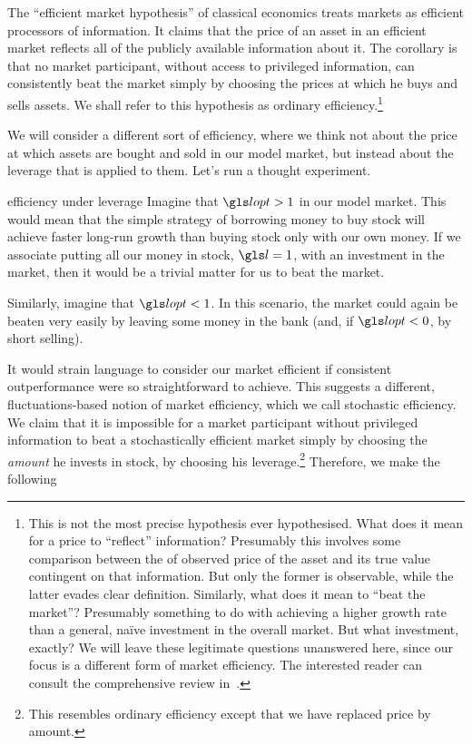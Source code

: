 The ``efficient market hypothesis'' of classical economics treats markets as efficient processors of information. It claims that the price of an asset in an efficient market reflects all of the publicly available information about it. The corollary is that no market participant, without access to privileged information, can consistently beat the market simply by choosing the prices at which he buys and sells assets. We shall refer to this hypothesis as ordinary efficiency.\footnote{This is not the most precise hypothesis ever hypothesised. What does it mean for a price to ``reflect'' information? Presumably this involves some comparison between the of observed price of the asset and its true value contingent on that information. But only the former is observable, while the latter evades clear definition. Similarly, what does it mean to ``beat the market''? Presumably something to do with achieving a higher growth rate than a general, na\"{i}ve investment in the overall market. But what investment, exactly? We will leave these legitimate questions unanswered here, since our focus is a different form of market efficiency. The interested reader can consult the comprehensive review in~\cite{Sewell2011}.}

We will consider a different sort of efficiency, where we think not about the price at which assets are bought and sold in our model market, but instead about the leverage that is applied to them. Let's run a thought experiment.

\begin{thoughtex}{efficiency under leverage}
Imagine that $\lopt>1$ in our model market. This would mean that the simple strategy of borrowing money to buy stock will achieve faster long-run growth than buying stock only with our own money. If we associate putting all our money in stock, $\l=1$, with an investment in the market, then it would be a trivial matter for us to beat the market.

Similarly, imagine that $\lopt<1$. In this scenario, the market could again be beaten very easily by leaving some money in the bank (and, if $\lopt<0$, by short selling).
\end{thoughtex}

It would strain language to consider our market efficient if consistent outperformance were so straightforward to achieve. This suggests a different, fluctuations-based notion of market efficiency, which we call stochastic efficiency. We claim that it is impossible for a market participant without privileged information to beat a stochastically efficient market simply by choosing the \textit{amount} he invests in stock, \ie by choosing his leverage.\footnote{This resembles ordinary efficiency except that we have replaced price by amount.} Therefore, we make the following

